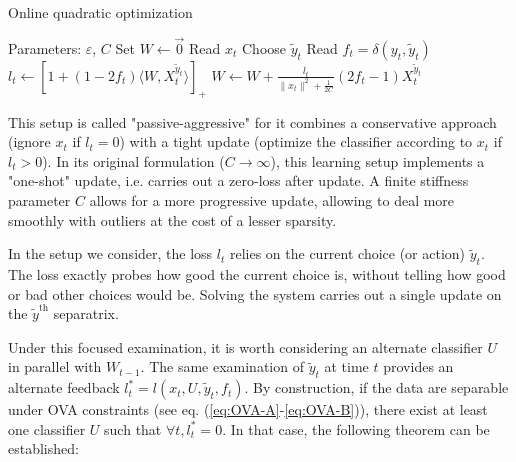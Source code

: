 \documentclass[preprint,12pt,authoryear]{elsarticle}
\begin{document}
\begin{algorithm}[t!]
	\caption{Online quadratic optimization}\label{algo:quad}
	\begin{algorithmic}
		\STATE Parameters:  $\varepsilon$, $C$
		\STATE Set $W \leftarrow \vec{0}$
		\STATE Read $x_t$
		\STATE Choose $\tilde{y}_t$
		\STATE Read $f_t = \delta(y_t,\tilde{y}_t)$
		\STATE $l_t \leftarrow \left[ 1+(1-2f_t)\langle W,X_t^{\tilde{y}_t}\rangle\right]_{+}$ 
		\STATE $W \leftarrow W + \frac{l_t}{\parallel x_t\parallel^2 + \frac{1}{2C}} (2f_t-1) X_t^{\tilde{y}_t}$
		\ENDFOR
	\end{algorithmic}
\end{algorithm}

This setup is called "passive-aggressive" for it combines a conservative approach (ignore $x_t$ if $l_t=0$) with a tight update (optimize the classifier according to $x_t$ if $l_t>0$).
In its original formulation ($C \rightarrow \infty$), this learning setup implements a "one-shot" update, i.e. carries out a zero-loss  after update. A finite stiffness parameter $C$ allows for a more progressive update, allowing to deal more smoothly with outliers at the cost of a lesser sparsity.

In the setup we consider, the loss $l_t$ relies on the current choice (or action) $\tilde{y}_t$. The loss exactly probes how good the current choice is, without telling how good or bad other choices would be. Solving the system carries out a single update on the  $\tilde{y}^\text{th}$ separatrix. 

Under this focused examination, it is worth considering an alternate classifier $U$ in parallel with $W_{t-1}$. The same examination of $\tilde{y}_t$ at time $t$ provides an alternate feedback $l^*_t = l(x_t,U,\tilde{y}_t,f_t)$. By construction, if the data are separable under OVA constraints (see eq. (\ref{eq:OVA-A}-\ref{eq:OVA-B})), there exist at least one classifier $U$ such that $\forall t, l^*_t = 0$. In that case, the following theorem can be established:

\end{document}
